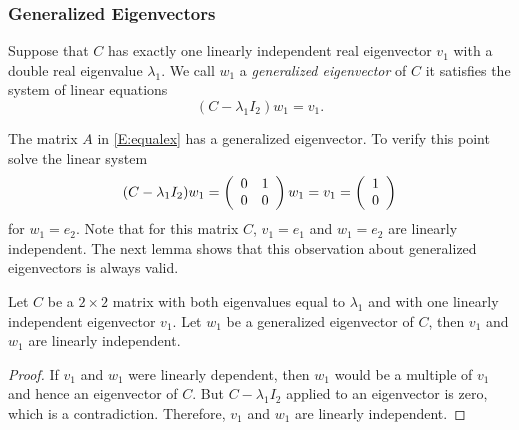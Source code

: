 \documentclass{ximera}
\begin{document}
\subsubsection*{Generalized Eigenvectors}

Suppose that $C$ has exactly one linearly independent real eigenvector 
$v_1$ with a double real eigenvalue $\lambda_1$.  We call $w_1$ a 
{\em generalized eigenvector\/} of $C$ 
it satisfies the system of linear equations
\begin{equation} \label{e:Cw=lw+va}
(C-\lambda_1I_2)w_1 = v_1.
\end{equation}

The matrix $A$ in \eqref{E:equalex} has a generalized eigenvector. To verify
this point solve the linear system
\[
(C-\lambda_1I_2)w_1 = \left(\begin{array}{rr} 0 & 1\\ 0 &0\end{array}\right)w_1 = v_1 = \left(\begin{array}{r} 1 \\ 0\end{array}\right)
\]
for $w_1=e_2$.   Note that for this matrix $C$, $v_1 = e_1$ and $w_1 = e_2$ 
are linearly independent.  The next lemma shows that this observation about
generalized eigenvectors is always valid.

\begin{lemma}  \label{L:geneig2}
Let $C$ be a $2\times 2$ matrix with both eigenvalues equal to $\lambda_1$
and with one linearly independent eigenvector $v_1$.  
Let $w_1$ be a generalized eigenvector of $C$, then $v_1$ and 
$w_1$ are linearly independent. 

\end{lemma}

\begin{proof}  If $v_1$ and $w_1$ were linearly dependent, then $w_1$ would be 
a multiple of $v_1$ and hence an eigenvector of $C$.  But $C-\lambda_1I_2$
applied to an eigenvector is zero, which is a contradiction.  Therefore, 
$v_1$ and $w_1$ are linearly independent.
\end{proof}
\end{document}
